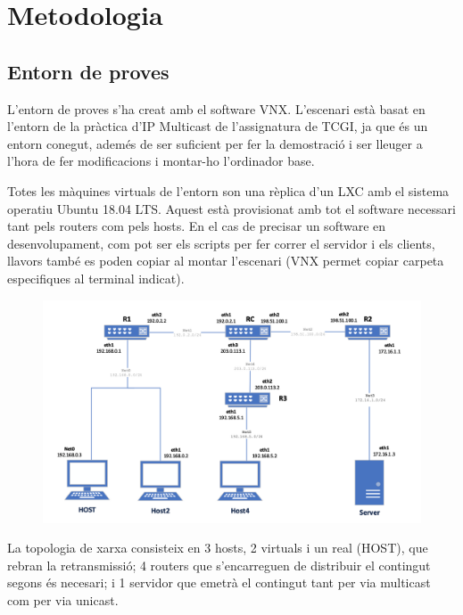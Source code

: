 \section{Metodologia}
\subsection{Entorn de proves}
{
    L'entorn de proves s'ha creat amb el software VNX. L'escenari està basat en l'entorn de la pràctica d'IP Multicast
    de l'assignatura de TCGI, ja que és un entorn conegut, ademés de ser suficient per fer la demostració i ser
    lleuger a l'hora de fer modificacions i montar-ho l'ordinador base.

    Totes les màquines virtuals de l'entorn son una rèplica d'un LXC amb el sistema operatiu Ubuntu 18.04 LTS.
    Aquest està provisionat amb tot el software necessari tant pels routers com pels hosts. En el cas de precisar un
    software en desenvolupament, com pot ser els scripts per fer correr el servidor i els clients, llavors
    també es poden copiar al montar l'escenari (VNX permet copiar carpeta especifiques al terminal indicat).

    \begin{figure}[H]
        \label{fig:network}
        \centering
        \includegraphics[width=15cm]{img/03_metodologia/network_topology.png}
    \end{figure}

    La topologia de xarxa consisteix en 3 hosts, 2 virtuals i un real (HOST), que rebran la retransmissió;
    4 routers que s'encarreguen de distribuir el contingut segons és necesari; i 1 servidor que emetrà el 
    contingut tant per via multicast com per via unicast.
}

